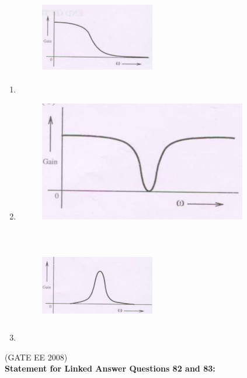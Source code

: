 \documentclass[journal,12pt,onecolumn]{IEEEtran}
\theoremstyle{remark}
\begin{document}
\begin{enumerate}[start=1, label=Q.\arabic*]
\begin{enumerate}[label=(\Alph*)]
    \item 
    \begin{figure}[H]
        \includegraphics[width=5cm, height=5cm]{Fig/q81-B.png}
    \end{figure}

    
    \item 
    \begin{figure}[H]
        \includegraphics[]{Fig/q81-C.png}
    \end{figure}


    \item 
    \begin{figure}[H]
        \includegraphics[width=5cm, height=5cm]{Fig/q81-D.png}
    \end{figure}




\end{enumerate}
\hfill (GATE EE 2008) \\[5mm]


\textbf{Statement for Linked Answer Questions 82 and 83:}\\


\end{enumerate}
\end{document}

